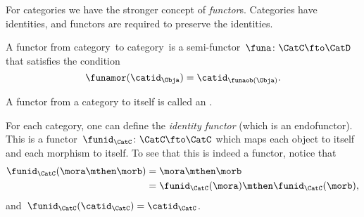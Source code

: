 For categories we have the stronger concept of \emph{functor}s.
Categories have identities, and functors are required to preserve the identities.

\begin{ctdefinition}
    \label{def:functor}
    A functor from category~\CatC to category~\CatD is a semi-functor~$\funa\colon \CatC \fto \CatD$
    that satisfies the condition
    \begin{equation}
        \label{eq:functor-condition}
        \funamor(\catid_\Obja)=\catid_{\funaob(\Obja)}.
    \end{equation}
\end{ctdefinition}

\begin{remark}
    A functor from a category to itself is called an \emph{}.
\end{remark}

\begin{example}
    For each category, one can define the \emph{identity functor} (which is an endofunctor).
    This is a functor~$\funid_\CatC \colon \CatC \fto \CatC$ which maps each object to itself and each morphism to itself.
    To see that this is indeed a functor, notice that
    \begin{equation*}
        \begin{aligned}
            \funid_\CatC(\mora \mthen \morb) & =\mora \mthen \morb                             \\
                                             & =\funid_\CatC(\mora)\mthen \funid_\CatC(\morb), 
        \end{aligned}
    \end{equation*}
    and~$\funid_\CatC(\catid_\CatC)=\catid_\CatC$.
\end{example}

